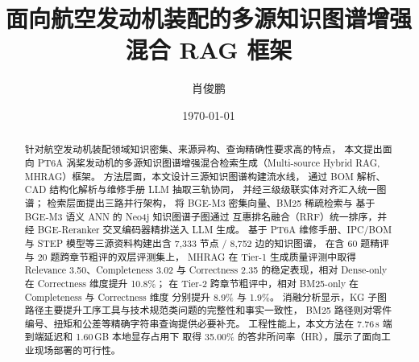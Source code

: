 \documentclass[12pt, a4paper]{article}
\title{\textbf{面向航空发动机装配的多源知识图谱增强混合 RAG 框架}}
\author{肖俊鹏}
\date{\today}
\begin{document}
\maketitle

\begin{abstract}
针对航空发动机装配领域知识密集、来源异构、查询精确性要求高的特点，
本文提出面向 PT6A 涡桨发动机的多源知识图谱增强混合检索生成（Multi-source Hybrid RAG, MHRAG）框架。
方法层面，本文设计三源知识图谱构建流水线，
通过 BOM 解析、CAD 结构化解析与维修手册 LLM 抽取三轨协同，
并经三级级联实体对齐汇入统一图谱；
检索层面提出三路并行架构，
将 BGE-M3 密集向量、BM25 稀疏检索与
基于 BGE-M3 语义 ANN 的 Neo4j 知识图谱子图通过
互惠排名融合（RRF）统一排序，并经 BGE-Reranker 交叉编码器精排送入 LLM 生成。
基于 PT6A 维修手册、IPC/BOM 与 STEP 模型等三源资料构建出含 7{,}333 节点 / 8{,}752 边的知识图谱，
在含 60 题精评与 20 题跨章节粗评的双层评测集上，
MHRAG 在 Tier-1 生成质量评测中取得 Relevance 3.50、Completeness 3.02 与
Correctness 2.35 的稳定表现，相对 Dense-only 在 Correctness 维度提升 10.8\%；
在 Tier-2 跨章节粗评中，相对 BM25-only 在 Completeness 与 Correctness 维度
分别提升 8.9\% 与 1.9\%。
消融分析显示，KG 子图路径主要提升工序工具与技术规范类问题的完整性和事实一致性，
BM25 路径则对零件编号、扭矩和公差等精确字符串查询提供必要补充。
工程性能上，本文方法在 7.76\,s 端到端延迟和 1.60\,GB 本地显存占用下
取得 35.00\% 的答非所问率（HR），展示了面向工业现场部署的可行性。
\end{abstract}

\newpage
\tableofcontents
\newpage










\end{document}
